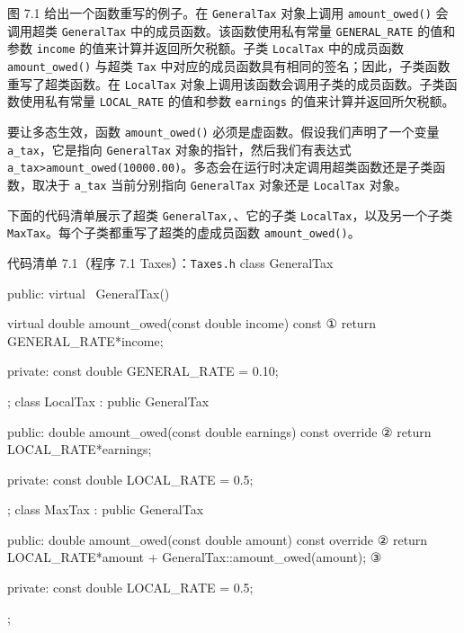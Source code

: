 图 7.1 给出一个函数重写的例子。在 \texttt{General\allowbreak{}Tax} 对象上调用 \texttt{amount\_\allowbreak{}owed(\allowbreak{})\allowbreak{}} 会调用超类 \texttt{General\allowbreak{}Tax} 中的成员函数。该函数使用私有常量 \texttt{GENERAL\_\allowbreak{}RATE} 的值和参数 \texttt{income} 的值来计算并返回所欠税额。子类 \texttt{LocalTax} 中的成员函数 \texttt{amount\_\allowbreak{}owed(\allowbreak{})\allowbreak{}} 与超类 \texttt{Tax} 中对应的成员函数具有相同的签名；因此，子类函数重写了超类函数。在 \texttt{LocalTax} 对象上调用该函数会调用子类的成员函数。子类函数使用私有常量 \texttt{LOCAL\_\allowbreak{}RATE} 的值和参数 \texttt{earnings} 的值来计算并返回所欠税额。


要让多态生效，函数 \texttt{amount\_\allowbreak{}owed(\allowbreak{})\allowbreak{}} 必须是虚函数。假设我们声明了一个变量 \texttt{a\_tax}，它是指向 \texttt{General\allowbreak{}Tax} 对象的指针，然后我们有表达式 \texttt{a\_\allowbreak{}tax>amount\_\allowbreak{}owed(\allowbreak{}10000.\allowbreak{}00)\allowbreak{}}。多态会在运行时决定调用超类函数还是子类函数，取决于 \texttt{a\_tax} 当前分别指向 \texttt{General\allowbreak{}Tax} 对象还是 \texttt{LocalTax} 对象。

下面的代码清单展示了超类 \texttt{General\allowbreak{}Tax,\allowbreak{}}、它的子类 \texttt{LocalTax}，以及另一个子类 \texttt{MaxTax}。每个子类都重写了超类的虚成员函数 \texttt{amount\_\allowbreak{}owed(\allowbreak{})\allowbreak{}}。

\begin{codeboxt}{代码清单 7.1（程序 7.1 Taxes）：\texttt{Taxes.h}}
class GeneralTax
{
public:
    virtual ~GeneralTax() {}

    virtual double amount_owed(const double income) const           ①
    {
        return GENERAL_RATE*income;
    }

private:
    const double GENERAL_RATE = 0.10;
};
class LocalTax : public GeneralTax
{
public:
    double amount_owed(const double earnings) const override        ②
    {
        return LOCAL_RATE*earnings;
    }

private:
    const double LOCAL_RATE = 0.5;
};
class MaxTax : public GeneralTax
{
public:
    double amount_owed(const double amount) const override          ②
    {
        return LOCAL_RATE*amount + GeneralTax::amount_owed(amount); ③
    }

private:
    const double LOCAL_RATE = 0.5;
};
\end{codeboxt}
\par
{}\par
{}\par

